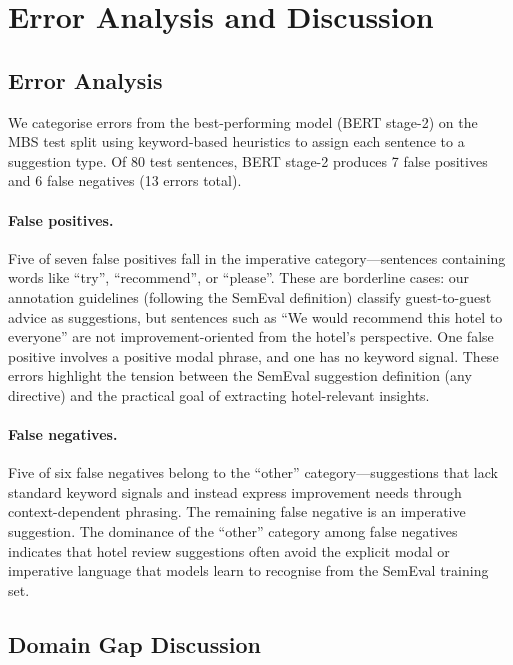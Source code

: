 \section{Error Analysis and Discussion}

\subsection{Error Analysis}

We categorise errors from the best-performing model (BERT
stage-2) on the MBS test split using keyword-based heuristics to
assign each sentence to a suggestion type. Of 80 test sentences,
BERT stage-2 produces 7 false positives and 6 false negatives (13
errors total).

\paragraph{False positives.} Five of seven false positives fall
  in the imperative category---sentences containing words like
  ``try'', ``recommend'', or ``please''. These are borderline
  cases: our annotation guidelines (following the SemEval
  definition) classify guest-to-guest advice as suggestions, but
  sentences such as ``We would recommend this hotel to everyone''
  are not improvement-oriented from the hotel's perspective. One
  false positive involves a positive modal phrase, and one has no
  keyword signal. These errors highlight the tension between the
  SemEval suggestion definition (any directive) and the practical
  goal of extracting hotel-relevant insights.

\paragraph{False negatives.} Five of six false negatives belong to
  the ``other'' category---suggestions that lack standard keyword
  signals and instead express improvement needs through
  context-dependent phrasing. The remaining false negative is an
  imperative suggestion. The dominance of the ``other'' category
  among false negatives indicates that hotel review suggestions
  often avoid the explicit modal or imperative language that models
  learn to recognise from the SemEval training set.

\subsection{Domain Gap Discussion}

